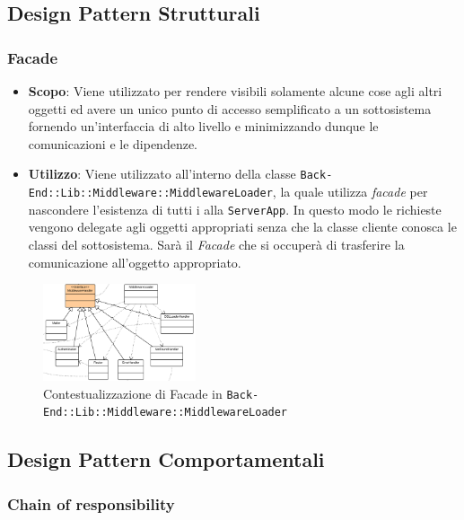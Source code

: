 \subsection{Design Pattern Strutturali}

\subsubsection{Facade}

\begin{itemize}

	\item \textbf{Scopo}: Viene utilizzato per rendere visibili solamente alcune cose agli altri oggetti ed avere un unico punto di accesso semplificato a un sottosistema fornendo un'interfaccia di alto livello e minimizzando dunque le comunicazioni e le dipendenze.
	\item \textbf{Utilizzo}: Viene utilizzato all'interno della classe \texttt{Back-End::Lib::Middleware::MiddlewareLoader}, la quale utilizza \textit{facade} per nascondere l'esistenza di tutti i  alla \texttt{ServerApp}. In questo modo le richieste vengono delegate agli oggetti appropriati senza che la classe cliente conosca le classi del sottosistema. Sarà il \textit{Facade} che si occuperà di trasferire la comunicazione all'oggetto appropriato.
\end{itemize}

\begin{figure}[H]
\centering \includegraphics[width=0.4\textwidth]{patterns/contestualizzazione/facade1.png}
\caption{Contestualizzazione di Facade in \texttt{Back-End::Lib::Middleware::MiddlewareLoader}}
\label{fig:mvc}
\end{figure}

\subsection{Design Pattern Comportamentali}

\subsubsection{Chain of responsibility}
\label{chain-of-responsibility}

